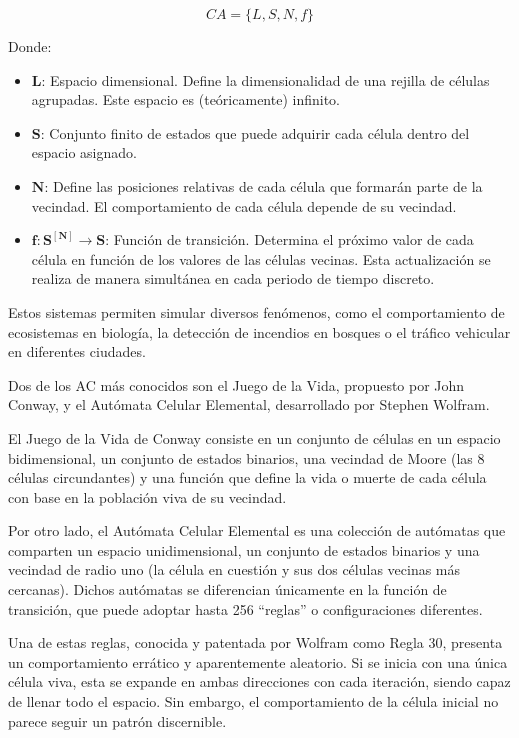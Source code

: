 \documentclass[12pt,twoside]{article}
\begin{document}
	\begin{equation*} CA = \{L, S, N, f\} \end{equation*}
	
	Donde: 
	\begin{itemize} \item $\boldsymbol{L}$: Espacio dimensional. Define la dimensionalidad de una rejilla de células agrupadas. Este espacio es (teóricamente) infinito.

		\item $\boldsymbol{S}$: Conjunto finito de estados que puede adquirir cada célula dentro del espacio asignado.
		
		\item $\boldsymbol{N}$: Define las posiciones relativas de cada célula que formarán parte de la vecindad. El comportamiento de cada célula depende de su vecindad.
		
		\item $\boldsymbol{f : S^{[N]} \rightarrow S}$: Función de transición. Determina el próximo valor de cada célula en función de los valores de las células vecinas. Esta actualización se realiza de manera simultánea en cada periodo de tiempo discreto.
	\end{itemize}
	
	Estos sistemas permiten simular diversos fenómenos, como el comportamiento de ecosistemas en biología, la detección de incendios en bosques o el tráfico vehicular en diferentes ciudades.
	
	Dos de los AC más conocidos son el Juego de la Vida, propuesto por John Conway, y el Autómata Celular Elemental, desarrollado por Stephen Wolfram.
	
	El Juego de la Vida de Conway consiste en un conjunto de células en un espacio bidimensional, un conjunto de estados binarios, una vecindad de Moore (las 8 células circundantes) y una función que define la vida o muerte de cada célula con base en la población viva de su vecindad.
	
	Por otro lado, el Autómata Celular Elemental es una colección de autómatas que comparten un espacio unidimensional, un conjunto de estados binarios y una vecindad de radio uno (la célula en cuestión y sus dos células vecinas más cercanas). Dichos autómatas se diferencian únicamente en la función de transición, que puede adoptar hasta 256 ``reglas'' o configuraciones diferentes.
	
	Una de estas reglas, conocida y patentada por Wolfram como Regla 30, presenta un comportamiento errático y aparentemente aleatorio. Si se inicia con una única célula viva, esta se expande en ambas direcciones con cada iteración, siendo capaz de llenar todo el espacio. Sin embargo, el comportamiento de la célula inicial no parece seguir un patrón discernible.
	
\end{document}

